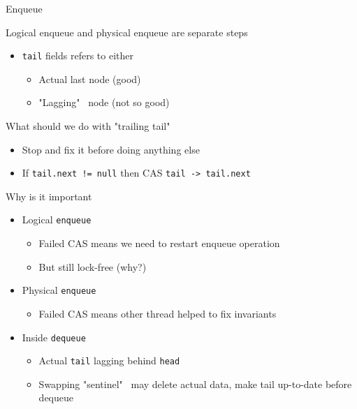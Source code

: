 \begin{frame}[fragile]{Enqueue}

Logical enqueue and physical enqueue are separate steps
\begin{itemize}
  \pause \item \texttt{tail} fields refers to either
  \begin{itemize}
    \pause \item Actual last node (good)
    \pause \item "Lagging" \ node (not so good)
  \end{itemize}  
\end{itemize}

\pause 
What should we do with "trailing tail"
\begin{itemize}
  \pause \item Stop and fix it before doing anything else
  \pause \item If \texttt{tail.next != null} then CAS \texttt{tail -> tail.next}
\end{itemize}

\pause 
Why is it important
\begin{itemize}
  \pause \item Logical \texttt{enqueue}
  \begin{itemize}
    \pause \item Failed CAS means we need to restart enqueue operation
    \pause \item But still lock-free (why?)
  \end{itemize}
  \pause \item Physical \texttt{enqueue}
  \begin{itemize}
    \pause \item Failed CAS means other thread helped to fix invariants
  \end{itemize}
  \pause \item Inside \texttt{dequeue}
  \begin{itemize}
    \pause \item Actual \texttt{tail} lagging behind \texttt{head}
    \pause \item Swapping "sentinel" \ may delete actual data, make tail up-to-date before dequeue
  \end{itemize}
\end{itemize}

\end{frame}

